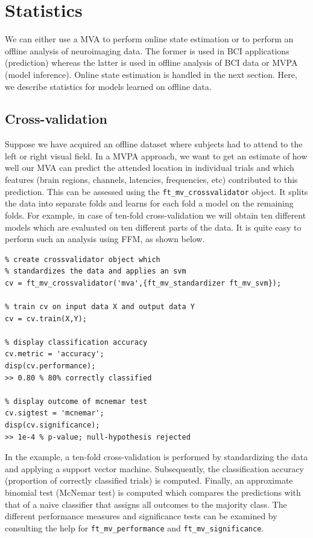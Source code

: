 \documentclass{article}
\renewcommand{\t}[1]{{\tt #1}}
\begin{document}
\section{Statistics}

We can either use a MVA to perform online state estimation or to perform an offline analysis of neuroimaging data. The former is used in BCI applications (prediction) whereas the latter is used in offline analysis of BCI data or MVPA (model inference). Online state estimation is handled in the next section. Here, we describe statistics for models learned on offline data.

\subsection{Cross-validation}

Suppose we have acquired an offline dataset where subjects had to attend to the left or right visual field. In a MVPA approach, we want to get an estimate of how well our MVA can predict the attended location in individual trials and which features (brain regions, channels, latencies, frequencies, etc) contributed to this prediction. This can be assessed using the \t{ft\_mv\_crossvalidator} object. It splits the data into separate folds and learns for each fold a model on the remaining folds. For example, in case of ten-fold cross-validation we will obtain ten different models which are evaluated on ten different parts of the data. It is quite easy to perform such an analysis using FFM, as shown below.
\begin{verbatim}
% create crossvalidator object which 
% standardizes the data and applies an svm
cv = ft_mv_crossvalidator('mva',{ft_mv_standardizer ft_mv_svm});

% train cv on input data X and output data Y
cv = cv.train(X,Y);

% display classification accuracy
cv.metric = 'accuracy';
disp(cv.performance);
>> 0.80 % 80% correctly classified

% display outcome of mcnemar test
cv.sigtest = 'mcnemar';
disp(cv.significance);
>> 1e-4 % p-value; null-hypothesis rejected
\end{verbatim}
In the example, a ten-fold cross-validation is performed by standardizing the data and applying a support vector machine. Subsequently, the classification accuracy (proportion of correctly classified trials) is computed. Finally, an approximate binomial test (McNemar test) is computed which compares the predictions with that of a naive classifier that assigns all outcomes to the majority class. The different performance measures and significance tests can be examined by consulting the help for \t{ft\_mv\_performance} and \t{ft\_mv\_significance}. 
\end{document}
